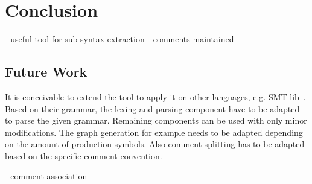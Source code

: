 
\chapter{Conclusion}\label{cha:Conclusion}
- useful tool for sub-syntax extraction
- comments maintained

\section{Future Work}\label{sec:FutureWork}
It is conceivable to extend the tool to apply it on other languages, e.g. SMT-lib~\cite{BFT-SMTLIB-17}. 
Based on their grammar, the lexing and parsing component have to be adapted to parse the given grammar. Remaining components can be used with only minor modifications. The graph generation for example needs to be adapted depending on the amount of production symbols. Also comment splitting has to be adapted based on the specific comment convention.


- comment association
